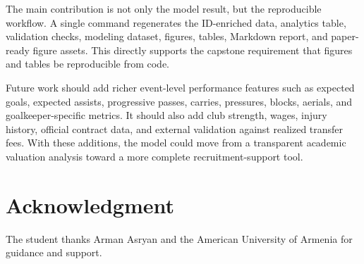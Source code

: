 \documentclass[conference]{IEEEtran}
\begin{document}
The main contribution is not only the model result, but the reproducible workflow. A single command regenerates the ID-enriched data, analytics table, validation checks, modeling dataset, figures, tables, Markdown report, and paper-ready figure assets. This directly supports the capstone requirement that figures and tables be reproducible from code.

Future work should add richer event-level performance features such as expected goals, expected assists, progressive passes, carries, pressures, blocks, aerials, and goalkeeper-specific metrics. It should also add club strength, wages, injury history, official contract data, and external validation against realized transfer fees. With these additions, the model could move from a transparent academic valuation analysis toward a more complete recruitment-support tool.

\section*{Acknowledgment}
The student thanks Arman Asryan and the American University of Armenia for guidance and support.



\end{document}
